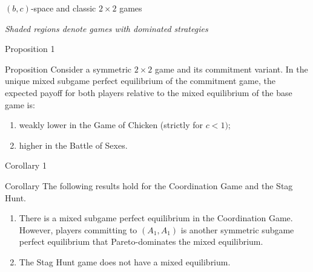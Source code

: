 \documentclass[slides.tex]{subfiles}
\begin{document}
\begin{frame}{$(b,c)$‐space and classic $2\times2$ games}
\centering
{}
\vspace{1ex}

\scriptsize\itshape
Shaded regions denote games with dominated strategies
\end{frame}
\begin{frame}{Proposition 1}
\begin{block}{Proposition}
Consider a symmetric \(2\times2\) game and its commitment variant.  
In the unique mixed subgame perfect equilibrium of the commitment game, the expected payoff for both players relative to the mixed equilibrium of the base game is:
\begin{enumerate}
    \item weakly lower in the Game of Chicken (strictly for \(c<1)\);
    \item higher in the Battle of Sexes.
\end{enumerate}
\end{block}
\end{frame}
\begin{frame}{Corollary 1}
\begin{block}{Corollary}
The following results hold for the Coordination Game and the Stag Hunt.
\begin{enumerate}
    \item There is a mixed subgame perfect equilibrium in the Coordination Game. However, players committing to \((A_1,A_1)\) is another symmetric subgame perfect equilibrium that Pareto-dominates the mixed equilibrium.
    \item The Stag Hunt game does not have a mixed equilibrium.
\end{enumerate}
\end{block}
\end{frame}
\end{document}
